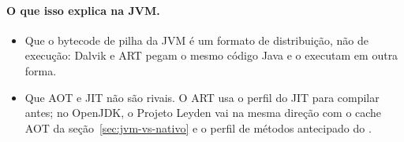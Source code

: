 \paragraph{O que isso explica na JVM.}
\begin{itemize}
\item Que o bytecode de pilha da JVM é um formato de distribuição, não
  de execução: Dalvik e ART pegam o mesmo código Java e o executam em
  outra forma.
\item Que AOT e JIT não são rivais. O ART usa o perfil do JIT para
  compilar antes; no OpenJDK, o Projeto Leyden vai na mesma direção com o
  cache AOT da seção~\ref{sec:jvm-vs-nativo} e o perfil de métodos
  antecipado do .
\end{itemize}

